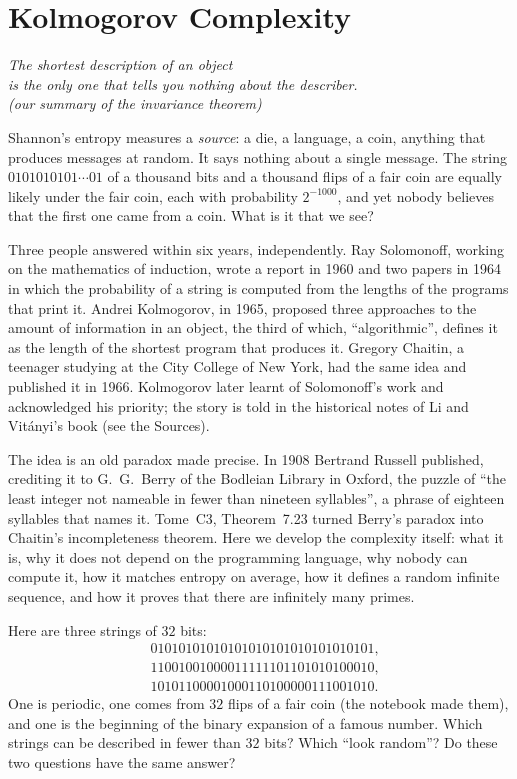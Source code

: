\chapter{Kolmogorov Complexity}\label{ch:kolmogorov}

\begin{center}\itshape
The shortest description of an object\\
is the only one that tells you nothing about the describer.\\
\upshape(our summary of the invariance theorem)
\end{center}

Shannon's entropy measures a \emph{source}: a die, a language, a coin, anything that produces messages at random. It says nothing about a single message. The string $0101010101\cdots01$ of a thousand bits and a thousand flips of a fair coin are equally likely under the fair coin, each with probability $2^{-1000}$, and yet nobody believes that the first one came from a coin. What is it that we see?

Three people answered within six years, independently. Ray Solomonoff, working on the mathematics of induction, wrote a report in 1960 and two papers in 1964 in which the probability of a string is computed from the lengths of the programs that print it. Andrei Kolmogorov, in 1965, proposed three approaches to the amount of information in an object, the third of which, ``algorithmic'', defines it as the length of the shortest program that produces it. Gregory Chaitin, a teenager studying at the City College of New York, had the same idea and published it in 1966. Kolmogorov later learnt of Solomonoff's work and acknowledged his priority; the story is told in the historical notes of Li and Vitányi's book (see the Sources).

The idea is an old paradox made precise. In 1908 Bertrand Russell published, crediting it to G.~G.~Berry of the Bodleian Library in Oxford, the puzzle of ``the least integer not nameable in fewer than nineteen syllables'', a phrase of eighteen syllables that names it. Tome~C3, Theorem~7.23 turned Berry's paradox into Chaitin's incompleteness theorem. Here we develop the complexity itself: what it is, why it does not depend on the programming language, why nobody can compute it, how it matches entropy on average, how it defines a random infinite sequence, and how it proves that there are infinitely many primes.

\begin{think}
Here are three strings of $32$ bits:
\[
\begin{aligned}
&01010101010101010101010101010101,\\
&11001001000011111101101010100010,\\
&10101100001000110100000111001010.
\end{aligned}
\]
One is periodic, one comes from $32$ flips of a fair coin (the notebook made them), and one is the beginning of the binary expansion of a famous number. Which strings can be described in fewer than $32$ bits? Which ``look random''? Do these two questions have the same answer?
\end{think}

